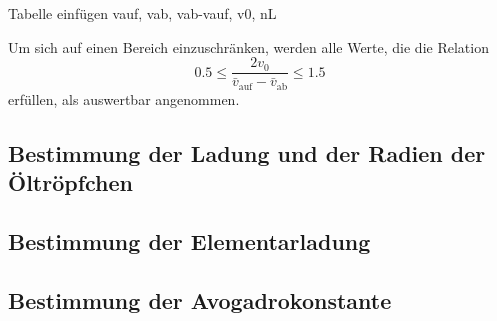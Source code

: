 Tabelle einfügen vauf, vab, vab-vauf, v0, nL

Um sich auf einen Bereich einzuschränken, werden alle Werte, die die Relation 
\begin{equation*}
    0.5\leq \frac{2v_0}{\bar{v}_{\text{auf}}-\bar{v}_{\text{ab}}}\leq 1.5
\end{equation*}
erfüllen, als auswertbar angenommen.

\subsection{Bestimmung der Ladung und der Radien der Öltröpfchen}

\subsection{Bestimmung der Elementarladung}

\subsection{Bestimmung der Avogadrokonstante}



